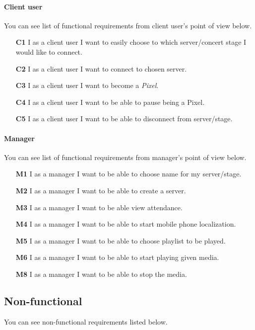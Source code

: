 \paragraph{Client user} You can see list of functional requirements from client user's point of view below.
\begin{enumerate}
	\item[\textbf{C1}] \label{req_C1}
		I as a client user I want to easily choose to which server/concert stage I would like to connect.
	\item[\textbf{C2}] \label{req_C2}
		I as a client user I want to connect to chosen server.
	\item[\textbf{C3}] \label{req_C3}
		I as a client user I want to become a \emph{Pixel}.
	\item[\textbf{C4}] \label{req_C4}
		I as a client user I want to be able to pause being a Pixel.
	\item[\textbf{C5}] \label{req_C5}
		I as a client user I want to be able to disconnect from server/stage.
\end{enumerate}


\paragraph{Manager} You can see list of functional requirements from manager's point of view below.
\begin{enumerate}
	\item[\textbf{M1}] \label{req_M1}
		I as a manager I want to be able to choose name for my server/stage.
	\item[\textbf{M2}] \label{req_M2}
		I as a manager I want to be able to create a server.
	\item[\textbf{M3}] \label{req_M3}
		I as a manager I want to be able view attendance.
	\item[\textbf{M4}] \label{req_M4}
		I as a manager I want to be able to start mobile phone localization.
	\item[\textbf{M5}] \label{req_M5}
		I as a manager I want to be able to choose playlist to be played.
	\item[\textbf{M6}] \label{req_M6}
		I as a manager I want to be able to start playing given media.
	\item[\textbf{M8}] \label{req_M7}
		I as a manager I want to be able to stop the media.
\end{enumerate}

\subsection{Non-functional}
You can see non-functional requirements listed below.

